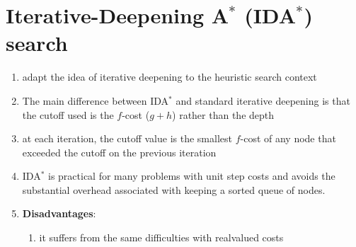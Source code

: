 \section{Iterative-Deepening A$^\ast$ (IDA$^\ast$) search \cite{ai/book/Artificial-Intelligence-A-Modern-Approach/Russell-Norvig}}
\label{AI: Algorithms/Iterative-Deepening A* search}


\begin{enumerate}[itemsep=0.2cm]

\item adapt the idea of iterative deepening to the heuristic search context
\hfill \cite{ai/book/Artificial-Intelligence-A-Modern-Approach/Russell-Norvig}

\item The main difference between IDA$^\ast$ and standard iterative deepening is that the cutoff used is the $f$-cost ($g + h$) rather than the depth
\hfill \cite{ai/book/Artificial-Intelligence-A-Modern-Approach/Russell-Norvig}

\item at each iteration, the cutoff value is the smallest $f$-cost of any node that exceeded the cutoff on the previous iteration
\hfill \cite{ai/book/Artificial-Intelligence-A-Modern-Approach/Russell-Norvig}

\item IDA$^\ast$ is practical for many problems with unit step costs and avoids the substantial overhead associated with keeping a sorted queue of nodes. 
\hfill \cite{ai/book/Artificial-Intelligence-A-Modern-Approach/Russell-Norvig}

\item \textbf{Disadvantages}:
\begin{enumerate}[itemsep=0.2cm]
    \item  it suffers from the same difficulties with realvalued costs
    \hfill \cite{ai/book/Artificial-Intelligence-A-Modern-Approach/Russell-Norvig}
\end{enumerate}

\end{enumerate}




